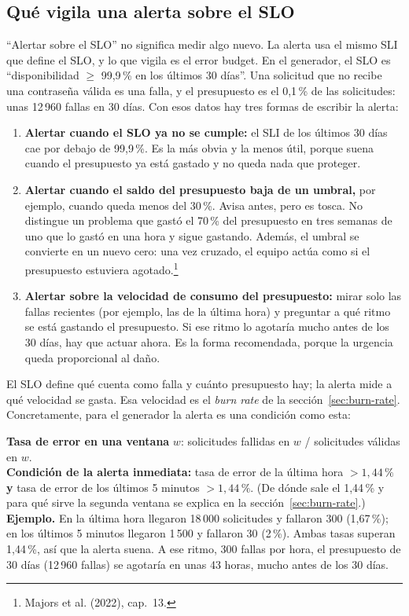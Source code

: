 \documentclass[variant=apuntes,cover=institutional,mode=screen]{ua-engineering-v6-article}
\begin{document}
\subsection{Qué vigila una alerta sobre el SLO}\label{sec:alerta-slo}

``Alertar sobre el SLO'' no significa medir algo nuevo. La alerta usa el mismo SLI que define el SLO, y lo que vigila es el error budget. En el generador, el SLO es ``disponibilidad $\ge$ 99,9\,\% en los últimos 30 días''. Una solicitud que no recibe una contraseña válida es una falla, y el presupuesto es el 0,1\,\% de las solicitudes: unas 12\,960 fallas en 30 días. Con esos datos hay tres formas de escribir la alerta:

\begin{enumerate}
\item \textbf{Alertar cuando el SLO ya no se cumple:} el SLI de los últimos 30 días cae por debajo de 99,9\,\%. Es la más obvia y la menos útil, porque suena cuando el presupuesto ya está gastado y no queda nada que proteger.
\item \textbf{Alertar cuando el saldo del presupuesto baja de un umbral,} por ejemplo, cuando queda menos del 30\,\%. Avisa antes, pero es tosca. No distingue un problema que gastó el 70\,\% del presupuesto en tres semanas de uno que lo gastó en una hora y sigue gastando. Además, el umbral se convierte en un nuevo cero: una vez cruzado, el equipo actúa como si el presupuesto estuviera agotado.\footnote{Majors et al. (2022), cap.~13.}
\item \textbf{Alertar sobre la velocidad de consumo del presupuesto:} mirar solo las fallas recientes (por ejemplo, las de la última hora) y preguntar a qué ritmo se está gastando el presupuesto. Si ese ritmo lo agotaría mucho antes de los 30 días, hay que actuar ahora. Es la forma recomendada, porque la urgencia queda proporcional al daño.
\end{enumerate}

El SLO define qué cuenta como falla y cuánto presupuesto hay; la alerta mide a qué velocidad se gasta. Esa velocidad es el \emph{burn rate} de la sección~\ref{sec:burn-rate}. Concretamente, para el generador la alerta es una condición como esta:

\begin{uainfo}
\textbf{Tasa de error en una ventana} $w$: solicitudes fallidas en $w$ / solicitudes válidas en $w$.\\[2pt]
\textbf{Condición de la alerta inmediata:} tasa de error de la última hora $> 1{,}44\,\%$ \textbf{y} tasa de error de los últimos 5 minutos $> 1{,}44\,\%$. (De dónde sale el 1,44\,\% y para qué sirve la segunda ventana se explica en la sección~\ref{sec:burn-rate}.)\\[2pt]
\textbf{Ejemplo.} En la última hora llegaron 18\,000 solicitudes y fallaron 300 (1,67\,\%); en los últimos 5 minutos llegaron 1\,500 y fallaron 30 (2\,\%). Ambas tasas superan 1,44\,\%, así que la alerta suena. A ese ritmo, 300 fallas por hora, el presupuesto de 30 días (12\,960 fallas) se agotaría en unas 43 horas, mucho antes de los 30 días.
\end{uainfo}
\end{document}
